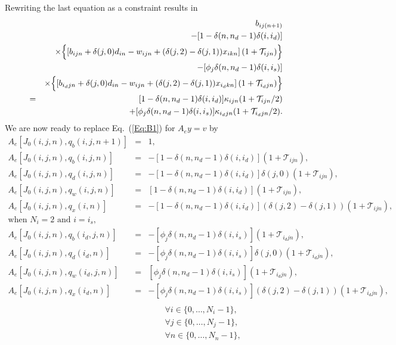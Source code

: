 \documentclass{report}[fleqn,11pt]
\begin{document}
Rewriting the last equation as a constraint results in
\begin{eqnarray}
	&&b_{ij(n+1)} 
	  \nonumber  \\
	&& - [1 - \delta(n, n_d-1)\delta(i, i_d)] \nonumber\\
	&& \times \Bigl\{ \left[b_{ijn} + \delta(j, 0)d_{in} - w_{ijn}
	+ (\delta(j, 2) - \delta(j, 1))x_{ikn} \right](1 + \mathcal{T}_{ijn}) \Bigr\}
	\nonumber \\
	&&- [\phi_j\delta(n, n_d-1)\delta(i, i_s)] \nonumber \\
	&& \times \Bigl\{ \left[b_{i_djn} + \delta(j, 0)d_{in} - w_{ijn}
	+ (\delta(j, 2) - \delta(j, 1))x_{i_dkn}
	\right](1 + \mathcal{T}_{i_djn})
	\Bigr\}
	\nonumber \\
	&=& [1 - \delta(n, n_d-1)\delta(i, i_d)] \kappa_{ijn} (1 + \mathcal{T}_{ijn}/2)
	\nonumber\\ &&
	+ [\phi_j\delta(n, n_d-1)\delta(i, i_s)]
	\kappa_{i_djn}(1 + \mathcal{T}_{i_djn}/2).
\end{eqnarray}
We are now ready to replace Eq.~(\ref{Eq:B1}) for $A_ey = v$ by
\begin{eqnarray}
        \label{Eq:B2}
        A_e[J_0(i, j, n), q_b(i, j, n+1)] &=& 1, \nonumber \\
        A_e[J_0(i, j, n), q_b(i, j, n)] &=& - [1 - \delta(n, n_d-1)\delta(i, i_d)]
		(1 + \mathcal{T}_{ijn}), \nonumber \\
        A_e[J_0(i, j, n), q_d(i, j, n)] &=& - [1 - \delta(n, n_d-1)\delta(i, i_d)]
		\delta(j, 0) (1 + \mathcal{T}_{ijn}), \nonumber \\
        A_e[J_0(i, j, n), q_w(i, j, n)] &=& [1 - \delta(n, n_d-1)\delta(i, i_d)]
	(1 + \mathcal{T}_{ijn}),\nonumber \\
        A_e[J_0(i, j, n), q_x(i, n)] &=& - [1 - \delta(n, n_d-1)\delta(i, i_d)]
                (\delta(j, 2) - \delta(j, 1))
		(1 + \mathcal{T}_{ijn}), \nonumber \\
		\text{when $N_i =2$ and $i = i_s$,} && \nonumber\\
        A_e[J_0(i, j, n), q_b(i_d, j, n)] &=& - [\phi_j\delta(n, n_d-1)\delta(i, i_s)]
		(1 + \mathcal{T}_{i_djn}), \nonumber \\
        A_e[J_0(i, j, n), q_d(i_d, n)] &=&  -[\phi_j\delta(n, n_d-1)\delta(i, i_s)]
		\delta(j, 0)(1 + \mathcal{T}_{i_djn}), \nonumber \\
        A_e[J_0(i, j, n), q_w(i_d, j, n)] &=& [\phi_j\delta(n, n_d-1)\delta(i, i_s)]
	(1 + \mathcal{T}_{i_djn}), \nonumber\\
        A_e[J_0(i, j, n), q_x(i_d, n)] &=& - [\phi_j\delta(n, n_d-1)\delta(i, i_s)]
                (\delta(j, 2) - \delta(j, 1))
		(1 + \mathcal{T}_{i_djn}), \nonumber \\
                \nonumber \\
        &&\qquad\forall i \in \{0,\ldots, N_i-1\},\nonumber\\
        &&\qquad\forall j \in \{0,\ldots, N_j-1\},\nonumber\\
        &&\qquad\forall n \in \{0,\ldots, N_n-1\}, \nonumber
\end{eqnarray}
\end{document}
